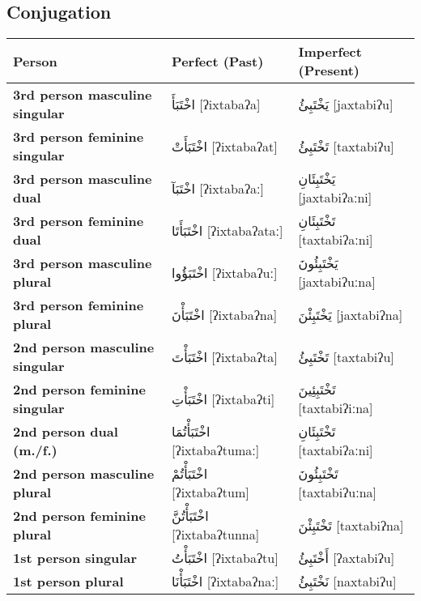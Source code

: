 \documentclass[letter,12pt]{article}
\begin{document}
\subsection{Conjugation}
\begin{longtable}{|>{\raggedright}p{3.5cm}|p{5cm}|p{5cm}|}
\hline
\textbf{Person} & \textbf{Perfect (Past)} & \textbf{Imperfect (Present)} \\
\hline
\textbf{3rd person masculine singular} & \textarabic{اخْتَبَأَ} [ʔixtabaʔa] & \textarabic{يَخْتَبِئُ} [jaxtabiʔu] \\
\hline
\textbf{3rd person feminine singular} & \textarabic{اخْتَبَأَتْ} [ʔixtabaʔat] & \textarabic{تَخْتَبِئُ} [taxtabiʔu] \\
\hline
\textbf{3rd person masculine dual} & \textarabic{اخْتَبَآ} [ʔixtabaʔaː] & \textarabic{يَخْتَبِئَانِ} [jaxtabiʔaːni] \\
\hline
\textbf{3rd person feminine dual} & \textarabic{اخْتَبَأَتَا} [ʔixtabaʔataː] & \textarabic{تَخْتَبِئَانِ} [taxtabiʔaːni] \\
\hline
\textbf{3rd person masculine plural} & \textarabic{اخْتَبَؤُوا} [ʔixtabaʔuː] & \textarabic{يَخْتَبِئُونَ} [jaxtabiʔuːna] \\
\hline
\textbf{3rd person feminine plural} & \textarabic{اخْتَبَأْنَ} [ʔixtabaʔna] & \textarabic{يَخْتَبِئْنَ} [jaxtabiʔna] \\
\hline
\textbf{2nd person masculine singular} & \textarabic{اخْتَبَأْتَ} [ʔixtabaʔta] & \textarabic{تَخْتَبِئُ} [taxtabiʔu] \\
\hline
\textbf{2nd person feminine singular} & \textarabic{اخْتَبَأْتِ} [ʔixtabaʔti] & \textarabic{تَخْتَبِئِينَ} [taxtabiʔiːna] \\
\hline
\textbf{2nd person dual (m./f.)} & \textarabic{اخْتَبَأْتُمَا} [ʔixtabaʔtumaː] & \textarabic{تَخْتَبِئَانِ} [taxtabiʔaːni] \\
\hline
\textbf{2nd person masculine plural} & \textarabic{اخْتَبَأْتُمْ} [ʔixtabaʔtum] & \textarabic{تَخْتَبِئُونَ} [taxtabiʔuːna] \\
\hline
\textbf{2nd person feminine plural} & \textarabic{اخْتَبَأْتُنَّ} [ʔixtabaʔtunna] & \textarabic{تَخْتَبِئْنَ} [taxtabiʔna] \\
\hline
\textbf{1st person singular} & \textarabic{اخْتَبَأْتُ} [ʔixtabaʔtu] & \textarabic{أَخْتَبِئُ} [ʔaxtabiʔu] \\
\hline
\textbf{1st person plural} & \textarabic{اخْتَبَأْنَا} [ʔixtabaʔnaː] & \textarabic{نَخْتَبِئُ} [naxtabiʔu] \\
\hline
\end{longtable}
\end{document}

